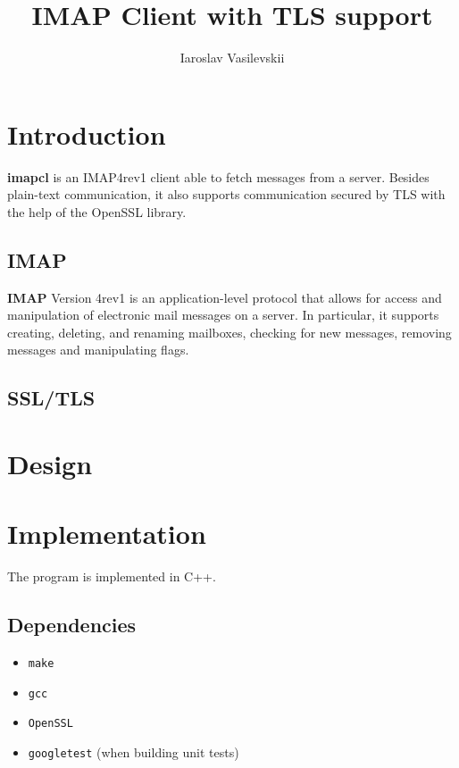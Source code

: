 \documentclass[a4]{report}
\title{IMAP Client with TLS support}
\author{Iaroslav Vasilevskii}
\begin{document}
\maketitle
\tableofcontents

\chapter{Introduction}

\textbf{imapcl} is an IMAP4rev1\cite{rfc3501} client able to fetch messages from a server. Besides plain-text communication, it also supports communication secured by TLS with the help of the OpenSSL library.

\section{IMAP}

\textbf{IMAP} Version 4rev1 is an application-level protocol that allows for access and manipulation of electronic mail messages on a server. In particular, it supports creating, deleting, and renaming mailboxes, checking for new messages, removing messages and manipulating flags.

\section{SSL/TLS}

\chapter{Design}


\chapter{Implementation}

The program is implemented in C++.

\section{Dependencies}

\begin{itemize}
\item \texttt{make}
\item \texttt{gcc}
\item \texttt{OpenSSL}
\item \texttt{googletest} (when building unit tests)
\end{itemize}
\end{document}
